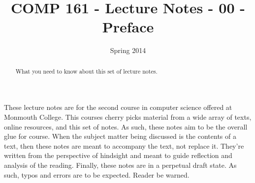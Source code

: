 \documentclass[]{tufte-handout}
\title{COMP 161 - Lecture Notes - 00 -Preface}
\date{Spring 2014}
\begin{document}
\maketitle

\begin{abstract}
What you need to know about this set of lecture notes.
\end{abstract}

These lecture notes are for the second course in computer science offered at Monmouth College.  This courses cherry picks material from a wide array of texts, online resources, and this set of notes.  As such, these notes aim to be the overall glue for course.  When the subject matter being discussed is the contents of a text, then these notes are meant to accompany the text, not replace it.  They're written from the perspective of hindsight and meant to guide reflection and analysis of the reading. 
Finally, these notes are in a perpetual draft state. As such, typos and errors are to be expected. Reader be warned.
\end{document}

